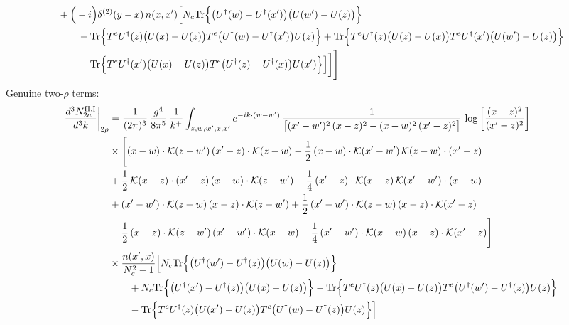 \documentclass[9pt]{article}
\numberwithin{equation}{section}
\begin{document}
\begin{align}
& +\Big(-i\Big)\delta^{(2)}(y-x)\,n(x,x')\Big[N_{c}{\rm Tr}\Big\{\big(U^{\dagger}(w)-U^{\dagger}(x')\big)\big(U(w')-U(z)\big)\Big\}\notag\\&\qquad-{\rm Tr}\Big\{T^{e}U^{\dagger}(z)\big(U(x)-U(z)\big)T^{e}\big(U^{\dagger}(w)-U^{\dagger}(x')\big)U(z)\Big\}+{\rm Tr}\Big\{T^{e}U^{\dagger}(z)\big(U(z)-U(x)\big)T^{e}U^{\dagger}(x')\big(U(w')-U(z)\big)\Big\}\notag\\&\qquad-{\rm Tr}\Big\{T^{e}U^{\dagger}(x')\big(U(x)-U(z)\big)T^{e}\big(U^{\dagger}(z)-U^{\dagger}(x)\big)U(x')\Big\}\Big]\bigg]\Bigg]\label{eq:S-II.I-2}
\end{align}
Genuine two-$\rho$ terms:
\begin{align}
\frac{d^{3}N^{\rm II.I}_{2a}}{d^{3}k}\bigg|_{2\rho}&=\frac{1}{(2\pi)^{3}}\,\frac{g^{4}}{8\pi^{5}}\,\frac{1}{k^{+}}\int_{z,w,w^{\prime},x,x^{\prime}}e^{-ik\cdot(w-w^{\prime})}\,\frac{1}{\big[(x^{\prime}-w^{\prime})^{2}\,(x-z)^{2}-(x-w)^{2}\,(x^{\prime}-z)^{2}\big]}\,\log\left[\frac{(x-z)^{2}}{(x^{\prime}-z)^{2}}\right]\notag\\
&\times\Bigg[(x-w)\cdot\mathcal{K}(z-w^{\prime})\,(x^{\prime}-z)\cdot\mathcal{K}(z-w)-\frac{1}{2}\,(x-w)\cdot\mathcal{K}(x^{\prime}-w^{\prime})\,\mathcal{K}(z-w)\cdot(x^{\prime}-z)\notag \\ & +\frac{1}{2}\,\mathcal{K}(x-z)\cdot(x^{\prime}-z)\,(x-w)\cdot\mathcal{K}(z-w^{\prime}) -\frac{1}{4}\,(x^{\prime}-z)\cdot\mathcal{K}(x-z)\,\mathcal{K}(x^{\prime}-w^{\prime})\cdot(x-w)\notag \\ & +(x^{\prime}-w^{\prime})\cdot\mathcal{K}(z-w)\,(x-z)\cdot\mathcal{K}(z-w^{\prime})+\frac{1}{2}\,(x^{\prime}-w^{\prime})\cdot\mathcal{K}(z-w)\,(x-z)\cdot\mathcal{K}(x^{\prime}-z)\notag \\ & -\frac{1}{2}\,(x-z)\cdot\mathcal{K}(z-w^{\prime})\,(x^{\prime}-w^{\prime})\cdot\mathcal{K}(x-w)-\frac{1}{4}\,(x^{\prime}-w^{\prime})\cdot\mathcal{K}(x-w)\,(x-z)\cdot\mathcal{K}(x^{\prime}-z)\Bigg]\notag\\ &\times\frac{n(x',x)}{N_{c}^{2}-1}\Big[N_{c}{\rm Tr}\Big\{\big(U^{\dagger}(w')-U^{\dagger}(z)\big)\big(U(w)-U(z)\big)\Big\}\notag\\&\qquad+N_{c}{\rm Tr}\Big\{\big(U^{\dagger}(x')-U^{\dagger}(z)\big)\big(U(x)-U(z)\big)\Big\}-{\rm Tr}\Big\{T^{e}U^{\dagger}(z)\big(U(x)-U(z)\big)T^{e}\big(U^{\dagger}(w')-U^{\dagger}(z)\big)U(z)\Big\}\notag\\&\qquad-{\rm Tr}\Big\{T^{e}U^{\dagger}(z)\big(U(x')-U(z)\big)T^{e}\big(U^{\dagger}(w)-U^{\dagger}(z)\big)U(z)\Big\}\Big]\\

\end{align}
\end{document}
